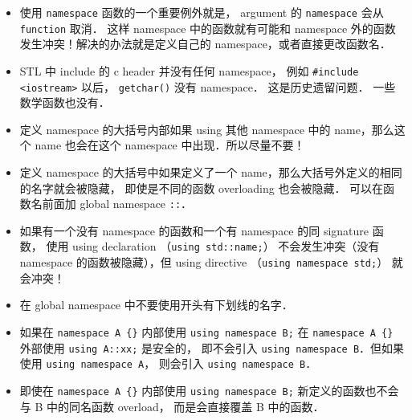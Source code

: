 
\begin{issues}
\issueDraft
\end{issues}

\begin{itemize}
\item 使用 \verb|namespace| 函数的一个重要例外就是， argument 的 \verb|namespace| 会从 \verb|function| 取消． 这样 namespace 中的函数就有可能和 namespace 外的函数发生冲突！解决的办法就是定义自己的 namespace，或者直接更改函数名．
\item STL 中 include 的 c header 并没有任何 namespace， 例如 \verb|#include <iostream>| 以后， \verb|getchar()| 没有 namespace． 这是历史遗留问题． 一些数学函数也没有．
\item 定义 namespace 的大括号内部如果 using 其他 namespace 中的 name，那么这个 name 也会在这个 namespace 中出现．所以尽量不要！
\item 定义 namespace 的大括号中如果定义了一个 name，那么大括号外定义的相同的名字就会被隐藏， 即使是不同的函数 overloading 也会被隐藏． 可以在函数名前面加 global namespace \verb|::|．
\item 如果有一个没有 namespace 的函数和一个有 namespace 的同 signature 函数， 使用 using declaration （\verb|using std::name;|） 不会发生冲突（没有 namespace 的函数被隐藏），但 using directive （\verb|using namespace std;|） 就会冲突！
\item 在 global namespace 中不要使用开头有下划线的名字．
\item 如果在 \verb|namespace A {}| 内部使用 \verb|using namespace B;| 在 \verb|namespace A {}| 外部使用 \verb|using A::xx;| 是安全的， 即不会引入 \verb|using namespace B|．但如果使用 \verb|using namespace A|， 则会引入 \verb|using namespace B|．
\item 即使在 \verb|namespace A {}| 内部使用 \verb|using namespace B;|  新定义的函数也不会与 B 中的同名函数 overload， 而是会直接覆盖 B 中的函数．
\end{itemize}
